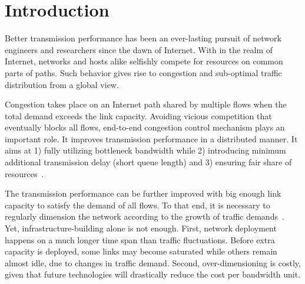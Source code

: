 \chapter{Introduction}
\label{sec:intro}

Better transmission performance has been an ever-lasting pursuit of network engineers and researchers since the dawn of Internet. 
With in the realm of Internet, networks and hosts alike selfishly compete for resources on common parts of paths.
Such behavior gives rise to congestion and sub-optimal traffic distribution from a global view.

Congestion takes place on an Internet path shared by multiple flows when the total demand exceeds the link capacity.
Avoiding vicious competition that eventually blocks all flows, end-to-end congestion control mechanism plays an important role. It improves transmission performance in a distributed manner.
It aims at 1) fully utilizing bottleneck bandwidth while 2) introducing minimum additional transmission delay (short queue length) and 3) ensuring fair share of resources~\cite{Jacobson1988, mathis1997macroscopic, Cardwell2016}.

The transmission performance can be further improved with big enough link capacity to satisfy the demand of all flows. To that end, it is necessary to regularly dimension the network according to the growth of traffic demands~\cite{pioro2004routing}. 
Yet, infrastructure-building alone is not enough. First, network deployment happens on a much longer time span than traffic fluctuations. Before extra capacity is deployed, some links may become saturated while others remain almost idle, due to changes in traffic demand. Second, over-dimensioning is costly, given that future technologies will drastically reduce the cost per bandwidth unit.

